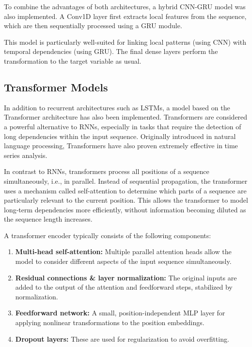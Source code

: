 To combine the advantages of both architectures, a hybrid CNN-GRU model was also implemented.
A Conv1D layer first extracts local features from the sequence, which are then sequentially processed using a GRU module.

This model is particularly well-suited for linking local patterns (using CNN) with temporal dependencies (using GRU).
The final dense layers perform the transformation to the target variable as usual.



\subsection{Transformer Models}

In addition to recurrent architectures such as LSTMs, a model based on the Transformer architecture has also been implemented.
Transformers are considered a powerful alternative to RNNs, especially in tasks that require the detection of long dependencies within the input sequence.
Originally introduced in natural language processing, Transformers have also proven extremely effective in time series analysis.

In contrast to RNNs, transformers process all positions of a sequence simultaneously, i.e., in parallel.
Instead of sequential propagation, the transformer uses a mechanism called self-attention to determine which parts of a sequence are particularly relevant to the current position.
This allows the transformer to model long-term dependencies more efficiently, without information becoming diluted as the sequence length increases.

A transformer encoder typically consists of the following components:

\begin{enumerate}
    \item \textbf{Multi-head self-attention:} Multiple parallel attention heads allow the model to consider different aspects of the input sequence simultaneously.

    \item \textbf{Residual connections \& layer normalization:} The original inputs are added to the output of the attention and feedforward steps, stabilized by normalization.

    \item \textbf{Feedforward network:} A small, position-independent MLP layer for applying nonlinear transformations to the position embeddings.

    \item \textbf{Dropout layers:} These are used for regularization to avoid overfitting.
\end{enumerate}

